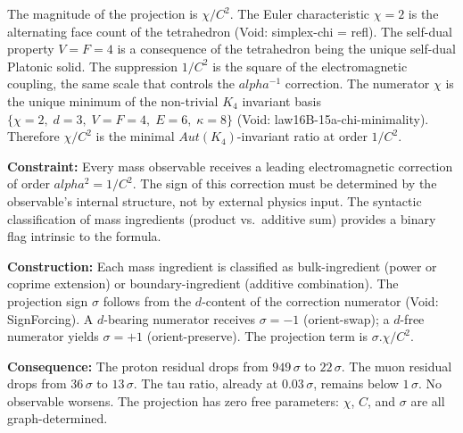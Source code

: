 \documentclass[11pt,a4paper]{book}
\def\alpha{alpha}%
\def\cdot{.}%
\def\mathrm#1{#1}%
\def\texttt#1{#1}%
\begin{document}
The magnitude of the projection is $\chi / C^2$.  The Euler
characteristic $\chi = 2$ is the alternating face count of the tetrahedron
(Void: \texttt{simplex-chi = refl}).  The self-dual property $V = F = 4$
is a consequence of the tetrahedron being the unique self-dual Platonic
solid.
The suppression $1/C^2$ is the square of the
electromagnetic coupling, the same scale that controls the
$\alpha^{-1}$ correction.  The numerator $\chi$ is the unique
minimum of the non-trivial $K_4$ invariant basis
$\{\chi{=}2,\; d{=}3,\; V{=}F{=}4,\; E{=}6,\; \kappa{=}8\}$
(Void: \texttt{law16B-15a-chi-minimality}).  Therefore $\chi / C^2$
is the minimal $\mathrm{Aut}(K_4)$-invariant ratio at order $1/C^2$.

\medskip
\noindent
\textbf{Constraint:}
Every mass observable receives a leading electromagnetic correction of
order $\alpha^2 = 1/C^2$.  The sign of this correction must be determined
by the observable's internal structure, not by external physics input.
The syntactic classification of mass ingredients (product vs.\ additive
sum) provides a binary flag intrinsic to the formula.

\medskip
\noindent
\textbf{Construction:}
Each mass ingredient is classified as \texttt{bulk-ingredient}
(power or coprime extension) or \texttt{boundary-ingredient}
(additive combination).  The projection sign $\sigma$ follows from the
$d$-content of the correction numerator (Void: \texttt{SignForcing}).
A $d$-bearing numerator receives $\sigma = -1$ (\texttt{orient-swap});
a $d$-free numerator yields $\sigma = +1$ (\texttt{orient-preserve}).
The projection term is $\sigma \cdot \chi / C^2$.

\medskip
\noindent
\textbf{Consequence:}
The proton residual drops from $949\,\sigma$ to $22\,\sigma$.
The muon residual drops from $36\,\sigma$ to $13\,\sigma$.
The tau ratio, already at $0.03\,\sigma$, remains below $1\,\sigma$.
No observable worsens.  The projection has zero free parameters:
$\chi$, $C$, and $\sigma$ are all graph-determined.
\end{document}
